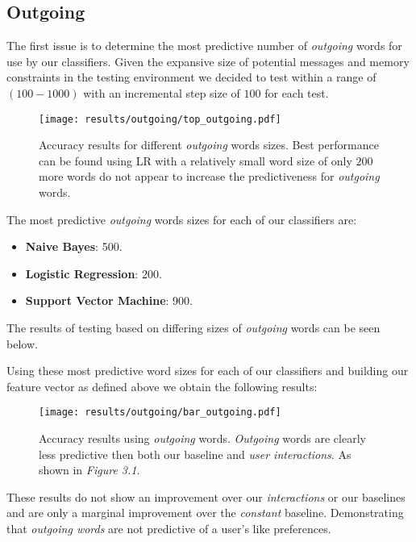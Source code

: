 \subsection{Outgoing}
\label{sec:id}

The first issue is to determine the most predictive number of \emph{outgoing} words for use by our classifiers. 
Given the expansive size of potential messages and memory constraints in the testing environment we decided to test within a range 
of $(100-1000)$ with an incremental step size of $100$ for each test.



\begin{figure}[h!]
	\begin{center}
		\texttt{[image: results/outgoing/top\_outgoing.pdf]}
		\caption{Accuracy results for different \emph{outgoing} words sizes. Best performance can be found using LR with a relatively small word size of only $200$ more words do not appear to increase the predictiveness for \emph{outgoing} words.}
	\end{center}
\end{figure}

The most predictive \emph{outgoing} words sizes for each of our classifiers are:
\begin{itemize}
\item \textbf{Naive Bayes}: 500.
\item \textbf{Logistic Regression}: 200.
\item \textbf{Support Vector Machine}: 900.
\end{itemize}

The results of testing based on differing sizes of \emph{outgoing} words can be seen below.

\clearpage

Using these most predictive word sizes for each of our classifiers and building our feature vector as defined above we obtain the following results:

\begin{figure}[h]
	\begin{center}
		\texttt{[image: results/outgoing/bar\_outgoing.pdf]}
		\caption{Accuracy results using \emph{outgoing} words. \emph{Outgoing} words are clearly less predictive then both our baseline and \emph{user interactions}. As shown in \emph{Figure 3.1}.}
	\end{center}
\end{figure}

These results do not show an improvement over our \emph{interactions} or our baselines and are only a marginal improvement over the \emph{constant} baseline. 
Demonstrating that \emph{outgoing words} are not predictive of a user's like preferences.


